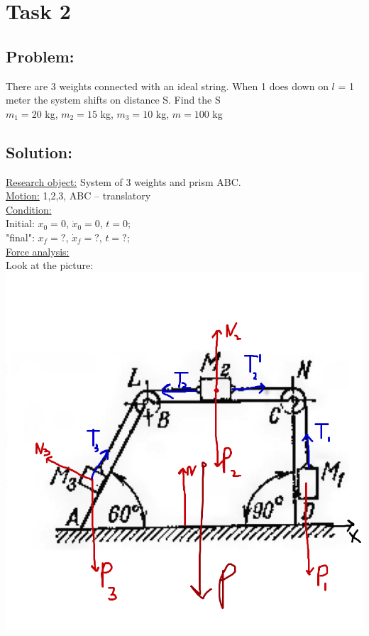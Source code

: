 \documentclass[a4paper,11pt,oneside,article]{memoir}
\begin{document}
\section*{Task 2}
\subsection{Problem:}
There are 3 weights connected with an ideal string. When 1 does down on $l$ = 1 meter the system shifts on distance S. Find the S\\
$m_1 = 20$ kg, $m_2 = 15$ kg, $m_3 = 10$ kg, $m = 100$ kg\\
\subsection{Solution:}
\underline{Research object:} System of 3 weights and prism ABC. \\
\underline{Motion:} 1,2,3, ABC – translatory\\
\underline{Condition:}\\
Initial: $x_0 = 0$, $\dot x_0 = 0$, $t=0$;\\
"final": $x_f = ?$, $\dot x_f = ?$, $t=?$;\\
\underline{Force analysis:}\\
Look at the picture:\\
\includegraphics[width=14cm]{images/ex3.png}\\
\end{document}
